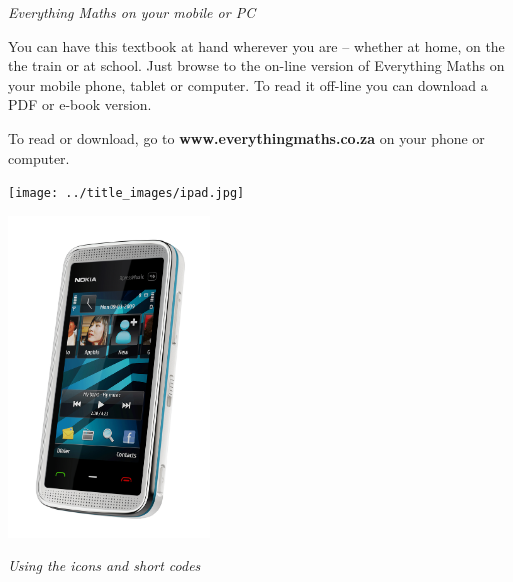\newpage
\thispagestyle{empty}

{\normalfont\sffamily\fontsize{22}\normalfont\itshape Everything Maths on your mobile or PC} \par

{\Large
You can have this textbook at hand wherever you are – whether at home, on the the train or at school.
Just browse to the on-line version of Everything Maths on your mobile phone, tablet or computer. To
read it off-line you can download a PDF or e-book version.\par


To read or download, go to \textbf{www.everythingmaths.co.za} on your phone or computer.} \vspace*{2cm}


\begin{center}
\begin{minipage}{0.4\textwidth}
\centering
\texttt{[image: ../title\_images/ipad.jpg]}
\end{minipage}
\begin{minipage}{0.4\textwidth}
\centering
\includegraphics[width=0.4\textwidth]{../title_images/phone.png}
\end{minipage}
\end{center}

\vspace*{2cm}


{\normalfont\sffamily\fontsize{22}\normalfont\itshape Using the icons and short codes} \par

